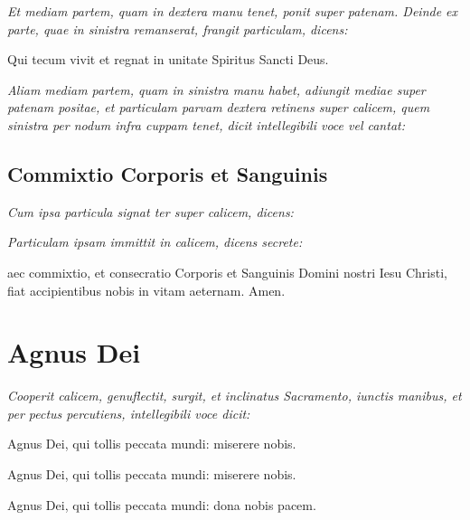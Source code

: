 \textit{%
    Et mediam partem, quam in dextera manu tenet, ponit super patenam.  Deinde
    ex parte, quae in sinistra remanserat, frangit particulam, dicens:
}

{
    \Large\centering
    Qui tecum vivit et regnat in unitate Spiritus Sancti Deus.
    \par
}

\textit{%
    Aliam mediam partem, quam in sinistra manu habet, adiungit mediae super
    patenam positae, et particulam parvam dextera retinens super calicem, quem
    sinistra per nodum infra cuppam tenet, dicit intellegibili voce vel cantat:
}


\subsection{Commixtio Corporis et Sanguinis}

\textit{Cum ipsa particula signat ter super calicem, dicens:}


\textit{Particulam ipsam immittit in calicem, dicens secrete:}

aec commixtio, et consecratio Corporis et Sanguinis Domini nostri
Iesu Christi, fiat accipientibus nobis in vitam aeternam.  Amen.

\section{Agnus Dei}


\textit{%
    Cooperit calicem, genuflectit, surgit, et inclinatus Sacramento, iunctis
    manibus, et per pectus percutiens, intellegibili voce dicit:
}

{
    \Large\centering
    \par Agnus Dei, qui tollis peccata mundi: miserere nobis.
    \par Agnus Dei, qui tollis peccata mundi: miserere nobis.
    \par Agnus Dei, qui tollis peccata mundi: dona nobis pacem.
    \par
}

\divisio

